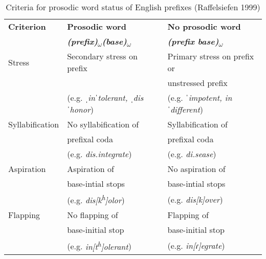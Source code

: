 \begin{table*}[t!]
	\caption{Criteria for prosodic word status of English prefixes (Raffelsiefen 1999)}
	\label{tbl:Criteria for prosodic work status of English prefixes (Raffelsiefen 1999)}
		\begin{tabular}{lll}
			\hline
			\textbf{Criterion} & \textbf{Prosodic word }&\textbf{ No prosodic word }\\ 
								&\textbf{\textit{(prefix)\textsubscript{$\omega$}(base)\textsubscript{$\omega$}}}& \textbf{\textit{(prefix base)\textsubscript{$\omega$}}}
			\vspace{0.3 cm}\\
			\hline 

			Stress & Secondary stress on prefix & Primary stress on prefix or  \\ 
							& 												& unstressed prefix \\
							&(e.g. \textit{ˌinˈtolerant, ˌdisˈhonor}) & (e.g. \textit{ ˈimpotent, inˈdifferent})
			\vspace{0.3 cm}\\ 
			
			Syllabification & No syllabification of  & Syllabification of  \\
						              &  prefixal coda 				& prefixal coda \\
						              & (e.g. \textit{dis.integrate})& (e.g. \textit{di.sease}) 
			\vspace{0.3 cm}\\ 
			
			Aspiration & Aspiration of 		& No aspiration of  \\
						       & base-intial stops &  base-intial stops \\
						       & (e.g. \textit{dis[k\textsuperscript{h}]olor}) & (e.g. \textit{dis[k]over})
			\vspace{0.3 cm}\\  
			
			
			Flapping & No flapping of  		& Flapping of\\
							 &  base-initial stop 	& base-initial stop\\
							& (e.g. \textit{in[t\textsuperscript{h}]olerant}) & (e.g. \textit{in[ɾ]egrate})
			\vspace{0.3 cm}\\   


\end{tabular}
\end{table*}
